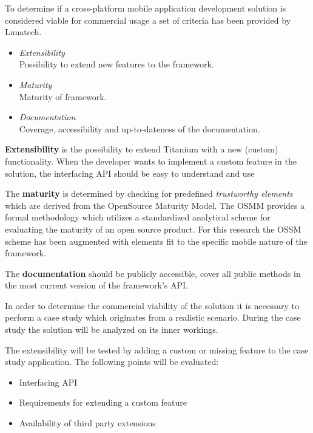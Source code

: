 To determine if a cross-platform mobile application development solution is considered viable for commercial usage a set of criteria has been provided by Lunatech.
\begin{itemize}
	\item \emph{Extensibility}\\
	Possibility to extend new features to the framework.
	\item \emph{Maturity}\\ 
	Maturity of framework.
	\item \emph{Documentation}\\
	Coverage, accessibility and up-to-dateness of the documentation.
\end{itemize}


{\bf Extensibility} is the possibility to extend Titanium with a new (custom) functionality. 
When the developer wants to implement a custom feature in the solution, the interfacing API should be easy to understand and use

The {\bf maturity} is determined by checking for predefined \emph{trustworthy elements} which are derived from the OpenSource Maturity Model\cite{Wikipedia2011}. The OSMM provides a formal methodology which utilizes a standardized analytical scheme for evaluating the maturity of an open source product. For this research the OSSM scheme has been augmented with elements fit to the specific mobile nature of the framework.

The {\bf documentation} should be publicly accessible, cover all public methods in the most current version of the framework's API.

%
%

In order to determine the commercial viability of the solution it is necessary to perform a case study which originates from a realistic scenario. During the case study the solution will be analyzed on its inner workings. 

The extensibility will be tested by adding a custom or missing feature to the case study application. The following points will be evaluated:
\begin{itemize}
  \setlength{\itemsep}{1pt}
  \setlength{\parskip}{0pt}
  \setlength{\parsep}{0pt}
	\item Interfacing API
	\item Requirements for extending a custom feature
	\item Availability of third party extensions
\end{itemize}

